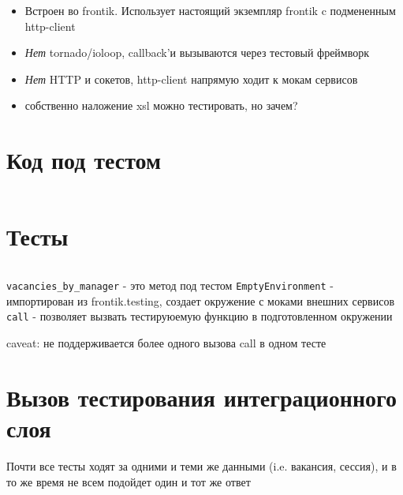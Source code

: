\documentclass[12pt]{article}
\begin{document}
\begin{itemize}
\item Встроен во frontik. Использует настоящий экземпляр frontik c подмененным http-client
\item \emph{Нет} tornado/ioloop, callback'и вызываются через тестовый фреймворк
\item \emph{Нет} HTTP и сокетов, http-client напрямую ходит к мокам сервисов
\item собственно наложение xsl можно тестировать, но зачем?

\end{itemize}



\section{Код под тестом}
\small
\inputminted[linenos=true]{python}{code.py}

\section{Тесты}

\tiny
\inputminted[linenos=true]{python}{test.py}

\verb+vacancies_by_manager+ - это метод под тестом
\verb+EmptyEnvironment+ - импортирован из frontik.testing, создает окружение с моками внешних сервисов
\verb+call+ - позволяет вызвать тестируюемую функцию в подготовленном окружении

caveat: не поддерживается более одного вызова call в одном тесте

\section{Вызов тестирования интеграционного слоя}

Почти все тесты ходят за одними и теми же данными (i.e. вакансия, сессия), и в то же время не всем подойдет один и тот же ответ
\end{document}
